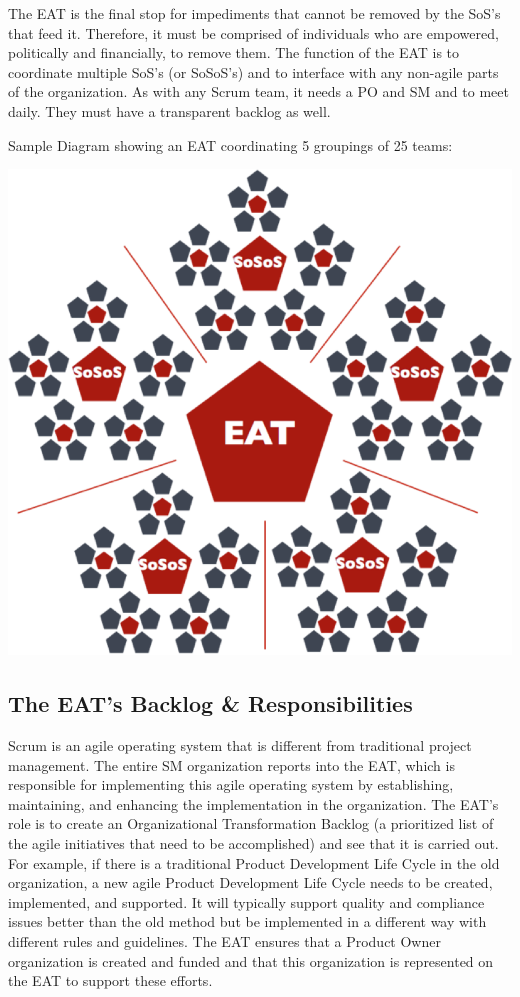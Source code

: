 \documentclass[12pt,a4paper,parskip=full]{scrartcl}
\begin{document}
The EAT is the final stop for
impediments that cannot be removed by the SoS's that feed it. Therefore, it
must be comprised of individuals who are empowered, politically and
financially, to remove them. 
The function of the EAT is to coordinate
multiple SoS's (or SoSoS's) and to interface with any non-agile parts 
of the organization. As with any Scrum team, it needs a PO and SM and to meet daily. They must have a transparent backlog as well.

Sample Diagram showing an EAT coordinating 5 groupings of 25 teams:

\includegraphics[width=\textwidth,height=\textheight,keepaspectratio]{SoS-EAT.png}

\subsection{The EAT's Backlog \& Responsibilities}
Scrum is an agile operating system that is different from traditional
project management. The entire SM organization reports into the EAT, which
is responsible for implementing this agile operating system by
establishing, maintaining, and enhancing the implementation in the
organization.
The EAT's role is to create an Organizational Transformation Backlog (a
prioritized list of the agile initiatives that need to be accomplished) and
see that it is carried out. For example, if there is a traditional Product
Development Life Cycle in the old organization, a new agile Product
Development Life Cycle needs to be created, implemented, and supported. It
will typically support quality and compliance issues better than the old
method but be implemented in a different way with different rules and
guidelines. The EAT ensures that a Product Owner organization is created and funded
and that this organization is represented on the EAT to support these efforts.
\end{document}
